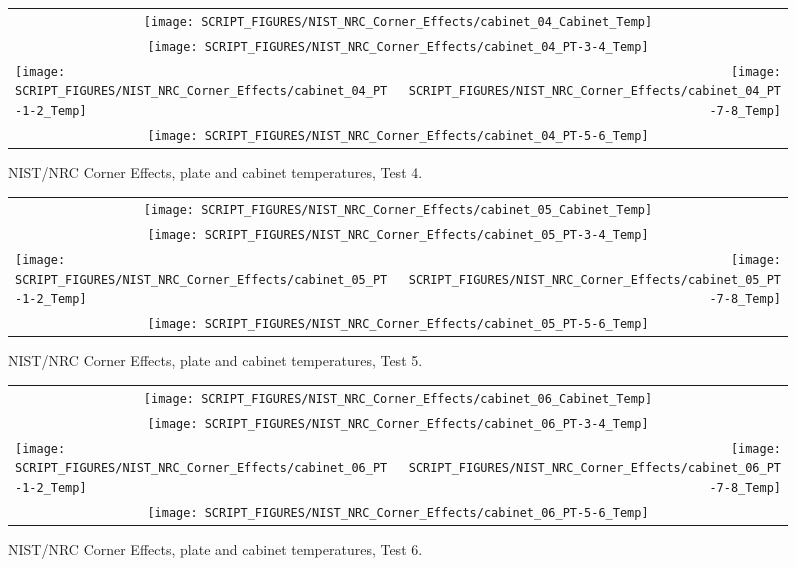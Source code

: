 \begin{figure}[p]
\begin{tabular*}{\textwidth}{l@{\extracolsep{\fill}}r}
\multicolumn{2}{c}{\texttt{[image: SCRIPT\_FIGURES/NIST\_NRC\_Corner\_Effects/cabinet\_04\_Cabinet\_Temp]}} \\
\multicolumn{2}{c}{\texttt{[image: SCRIPT\_FIGURES/NIST\_NRC\_Corner\_Effects/cabinet\_04\_PT-3-4\_Temp]}} \\
\texttt{[image: SCRIPT\_FIGURES/NIST\_NRC\_Corner\_Effects/cabinet\_04\_PT-1-2\_Temp]} &
\texttt{[image: SCRIPT\_FIGURES/NIST\_NRC\_Corner\_Effects/cabinet\_04\_PT-7-8\_Temp]} \\
\multicolumn{2}{c}{\texttt{[image: SCRIPT\_FIGURES/NIST\_NRC\_Corner\_Effects/cabinet\_04\_PT-5-6\_Temp]}}
\end{tabular*}
\caption{NIST/NRC Corner Effects, plate and cabinet temperatures, Test 4.}
\label{NIST_NRC_Cabinet_PT_Test_4}
\end{figure}

\begin{figure}[p]
\begin{tabular*}{\textwidth}{l@{\extracolsep{\fill}}r}
\multicolumn{2}{c}{\texttt{[image: SCRIPT\_FIGURES/NIST\_NRC\_Corner\_Effects/cabinet\_05\_Cabinet\_Temp]}} \\
\multicolumn{2}{c}{\texttt{[image: SCRIPT\_FIGURES/NIST\_NRC\_Corner\_Effects/cabinet\_05\_PT-3-4\_Temp]}} \\
\texttt{[image: SCRIPT\_FIGURES/NIST\_NRC\_Corner\_Effects/cabinet\_05\_PT-1-2\_Temp]} &
\texttt{[image: SCRIPT\_FIGURES/NIST\_NRC\_Corner\_Effects/cabinet\_05\_PT-7-8\_Temp]} \\
\multicolumn{2}{c}{\texttt{[image: SCRIPT\_FIGURES/NIST\_NRC\_Corner\_Effects/cabinet\_05\_PT-5-6\_Temp]}}
\end{tabular*}
\caption{NIST/NRC Corner Effects, plate and cabinet temperatures, Test 5.}
\label{NIST_NRC_Cabinet_PT_Test_5}
\end{figure}

\begin{figure}[p]
\begin{tabular*}{\textwidth}{l@{\extracolsep{\fill}}r}
\multicolumn{2}{c}{\texttt{[image: SCRIPT\_FIGURES/NIST\_NRC\_Corner\_Effects/cabinet\_06\_Cabinet\_Temp]}} \\
\multicolumn{2}{c}{\texttt{[image: SCRIPT\_FIGURES/NIST\_NRC\_Corner\_Effects/cabinet\_06\_PT-3-4\_Temp]}} \\
\texttt{[image: SCRIPT\_FIGURES/NIST\_NRC\_Corner\_Effects/cabinet\_06\_PT-1-2\_Temp]} &
\texttt{[image: SCRIPT\_FIGURES/NIST\_NRC\_Corner\_Effects/cabinet\_06\_PT-7-8\_Temp]} \\
\multicolumn{2}{c}{\texttt{[image: SCRIPT\_FIGURES/NIST\_NRC\_Corner\_Effects/cabinet\_06\_PT-5-6\_Temp]}}
\end{tabular*}
\caption{NIST/NRC Corner Effects, plate and cabinet temperatures, Test 6.}
\label{NIST_NRC_Cabinet_PT_Test_6}
\end{figure}

